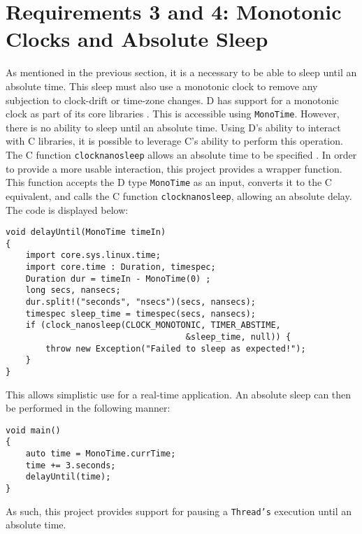 \section{Requirements 3 and 4: Monotonic Clocks and Absolute Sleep}
As mentioned in the previous section, it is a necessary to be able to sleep until 
an absolute time. This sleep must also use a monotonic clock 
to remove any subjection to clock-drift or time-zone changes. D has support 
for a monotonic clock as part of its core libraries 
\cite{dlang-core-time}. This is accessible using 
\texttt{MonoTime}. However, there is no ability to sleep until an 
absolute time. Using D's ability to interact with C libraries, it is possible 
to leverage C's ability to perform this operation. The C function 
\texttt{clock\textunderscore{}nanosleep} allows an absolute time to be specified
\cite{clock-nanosleep}.
In order to provide a more usable interaction, this project provides a wrapper
function. 
This function accepts the D type \texttt{MonoTime} as an input, converts it to the C 
equivalent, and calls the C function \texttt{clock\textunderscore{}nanosleep}, 
allowing an absolute delay. The code is displayed below: 
\begin{lstlisting}[basicstyle=\small]
void delayUntil(MonoTime timeIn)
{
    import core.sys.linux.time; 
    import core.time : Duration, timespec; 
    Duration dur = timeIn - MonoTime(0) ;
    long secs, nansecs; 
    dur.split!("seconds", "nsecs")(secs, nansecs); 
    timespec sleep_time = timespec(secs, nansecs); 
    if (clock_nanosleep(CLOCK_MONOTONIC, TIMER_ABSTIME, 
                                    &sleep_time, null)) {
        throw new Exception("Failed to sleep as expected!"); 
    }
}
\end{lstlisting}
This allows simplistic use for a real-time application. An absolute sleep can 
then be performed in the following manner: 
\begin{lstlisting}[basicstyle=\small]
void main()
{
    auto time = MonoTime.currTime; 
    time += 3.seconds; 
    delayUntil(time);
}
\end{lstlisting}
As such, this project provides support for pausing a \texttt{Thread's}
execution until an absolute time. 

